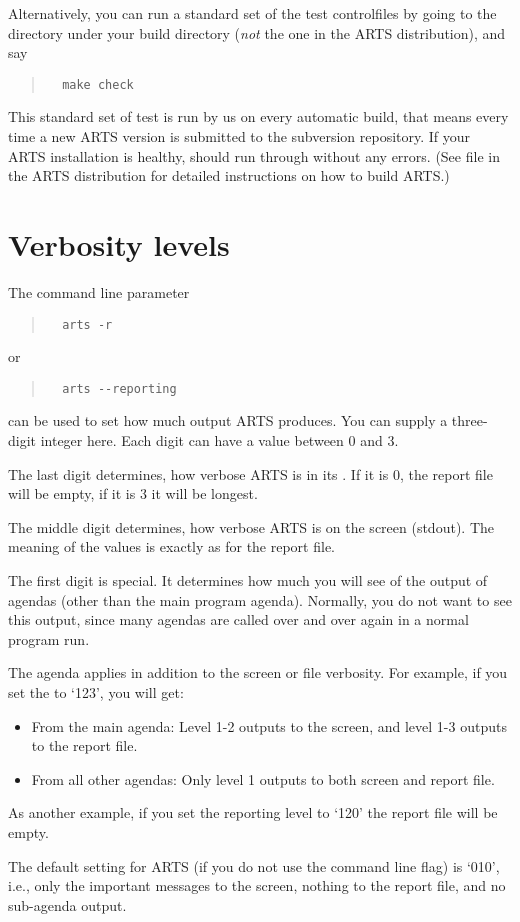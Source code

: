 Alternatively, you can run a standard set of the test controlfiles by
going to the  directory under your build directory
(\emph{not} the one in the ARTS distribution), and say
\begin{quote}
\begin{verbatim}
  make check
\end{verbatim}
\end{quote}
This standard set of test is run by us on every automatic build, that
means every time a new ARTS version is submitted to the subversion
repository. If your ARTS installation is healthy,  should run through without any errors. (See file
 in the ARTS distribution for detailed instructions
on how to build ARTS.)

\section{Verbosity levels}

The command line parameter 
\begin{quote}
\begin{verbatim}
  arts -r
\end{verbatim}
\end{quote}
or
\begin{quote}
\begin{verbatim}
  arts --reporting
\end{verbatim}
\end{quote}
can be used to set how much output ARTS produces. You can supply a
three-digit integer here. Each digit can have a value between 0 and 3.

The last digit determines, how verbose ARTS is in its
. If it is 0, the report file will be empty, if
it is 3 it will be longest.

The middle digit determines, how verbose ARTS is on the screen
(stdout). The meaning of the values is exactly as for the report
file. 

The first digit is special. It determines how much you will see of the
output of agendas (other than the main program agenda). Normally, you
do not want to see this output, since many agendas are called over and
over again in a normal program run. 

The agenda  applies in addition to the screen or
file verbosity. For example, if you set the  to `123', you will get:
\begin{itemize}
\item From the main agenda: Level 1-2 outputs to the screen, and level
  1-3 outputs to the report file.
\item From all other agendas: Only level 1 outputs to both screen and
  report file.
\end{itemize}
As another example, if you set the reporting level to `120' the
report file will be empty.

The default setting for ARTS (if you do not use the command line flag)
is `010', i.e., only the important messages to the screen, nothing to
the report file, and no sub-agenda output.


